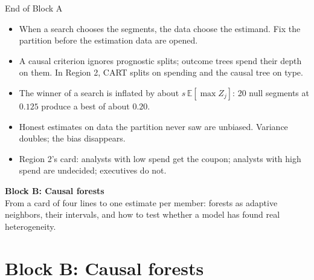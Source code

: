 \documentclass[aspectratio=169, 11pt, handout]{beamer}
\newcommand{\E}{\mathbb{E}}
\begin{document}
\begin{frame}{End of Block A}

\begin{itemize}
  \item When a search chooses the segments, the data choose the estimand. Fix the partition before the estimation data are opened.
  \item A causal criterion ignores prognostic splits; outcome trees spend their depth on them. In Region 2, CART splits on spending and the causal tree on type.
  \item The winner of a search is inflated by about $s\,\E[\max Z_j]$: 20 null segments at $0.125$ produce a best of about $0.20$.
  \item Honest estimates on data the partition never saw are unbiased. Variance doubles; the bias disappears.
  \item Region 2's card: analysts with low spend get the coupon; analysts with high spend are undecided; executives do not.
\end{itemize}

\vfill

\begin{center}
\Large \textbf{Block B: Causal forests}\\[0.4em]
\normalsize From a card of four lines to one estimate per member: forests as adaptive neighbors, their intervals, and how to test whether a model has found real heterogeneity.
\end{center}
\vfill
\end{frame}

\section{Block B: Causal forests}
\end{document}

